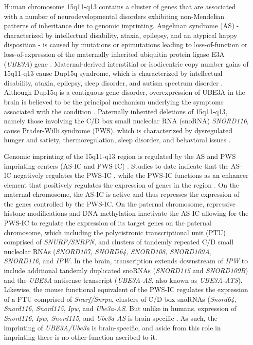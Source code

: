 Human chromosome 15q11-q13 contains a cluster of genes that are associated with a number of neurodevelopmental disorders exhibiting non-Mendelian patterns of inheritance due to genomic imprinting. Angelman syndrome (AS) - characterized by intellectual disability, ataxia, epilepsy, and an atypical happy disposition - is caused by mutations or epimutations leading to loss-of-function or loss-of-expression of the maternally inherited ubiquitin protein ligase E3A (\textit{UBE3A}) gene \cite{Yamasaki2003,Dindot2008,Sutcliffe1997}. Maternal-derived interstitial or isodicentric copy number gains of 15q11-q13 cause Dup15q syndrome, which is characterized by intellectual disability, ataxia, epilepsy, sleep disorder, and autism spectrum disorder \cite{Battaglia2008,Battaglia1997}. Although Dup15q is a contiguous gene disorder, overexpression of UBE3A in the brain is believed to be the principal mechanism underlying the symptoms associated with the condition \cite{Scoles2011}. Paternally inherited deletions of 15q11-q13, namely those involving the C/D box small nucleolar RNA (snoRNA) \textit{SNORD116}, cause Prader-Willi syndrome (PWS), which is characterized by dysregulated hunger and satiety, thermoregulation, sleep disorder, and behavioral issues \cite{Sahoo2008}.

Genomic imprinting of the 15q11-q13 region is regulated by the AS and PWS imprinting centers (AS-IC and PWS-IC) \cite{Buiting1999,Buiting1998,Kantor2006,Chamberlain2001,Buiting2001}. Studies to date indicate that the AS-IC negatively regulates the PWS-IC \cite{Kantor2006}, while the PWS-IC functions as an enhancer element that positively regulates the expression of genes in the region \cite{Nicholls2001}. On the maternal chromosome, the AS-IC is active and thus represses the expression of the genes controlled by the PWS-IC. On the paternal chromosome, repressive histone modifications and DNA methylation inactivate the AS-IC allowing for the PWS-IC to regulate the expression of its target genes on the paternal chromosome, which including the polycistronic transcriptional unit (PTU) comprised of \textit{SNURF/SNRPN}, and clusters of tandemly repeated C/D small nucleolar RNAs (\textit{SNORD107, SNORD64, SNORD108, SNORD109A, SNORD116}, and \textit{IPW}. In the brain, transcription extends downstream of \textit{IPW} to include additional tandemly duplicated snoRNAs (\textit{SNORD115} and \textit{SNORD109B}) and the \textit{UBE3A} antisense transcript (\textit{UBE3A-AS}, also known as \textit{UBE3A-ATS}). Likewise, the mouse functional equivalent of the PWS-IC regulates the expression of a PTU comprised of \textit{Snurf/Snrpn}, clusters of C/D box snoRNAs (\textit{Snord64, Snord116, Snord115}, \textit{Ipw}, and \textit{Ube3a-AS}. But unlike in humans, expression of \textit{Snord116, Ipw, Snord115,} and \textit{Ube3a-AS} is brain-specific \cite{Landers2004,LeMeur2005}. As such, the imprinting of \textit{UBE3A/Ube3a} is brain-specific, and aside from this role in imprinting there is no other function ascribed to it. 

